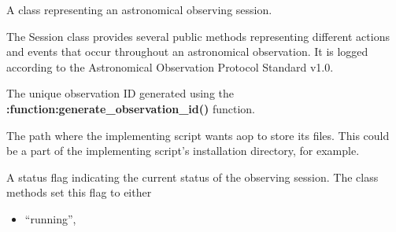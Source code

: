 \documentclass[letterpaper,10pt,english]{sphinxmanual}
\begin{document}
\begin{fulllineitems}
\label{\detokenize{autoapi/aop/aop/index:aop.aop.Session}}
\pysigstartsignatures
{}
\pysigstopsignatures
\sphinxAtStartPar
A class representing an astronomical observing session.

\sphinxAtStartPar
The Session class provides several public methods representing different
actions and events that occur throughout an astronomical observation.
It is logged according to the Astronomical Observation Protocol Standard v1.0.

\begin{fulllineitems}
\label{\detokenize{autoapi/aop/aop/index:aop.aop.Session.obsID}}
\pysigstartsignatures
{}
\pysigstopsignatures
\sphinxAtStartPar
The unique observation ID generated using the {\color{red}\bfseries{}:function:\textasciigrave{}generate\_observation\_id()\textasciigrave{}}
function.

\end{fulllineitems}


\begin{fulllineitems}
\label{\detokenize{autoapi/aop/aop/index:aop.aop.Session.filepath}}
\pysigstartsignatures
{}
\pysigstopsignatures
\sphinxAtStartPar
The path where the implementing script wants aop to store its files. This could be a part of the implementing
script’s installation directory, for example.

\end{fulllineitems}


\begin{fulllineitems}
\label{\detokenize{autoapi/aop/aop/index:aop.aop.Session.state}}
\pysigstartsignatures
{}
\pysigstopsignatures
\sphinxAtStartPar
A status flag indicating the current status of the observing session.
The class methods set this flag to either
\begin{itemize}
\item {} 
\sphinxAtStartPar
“running”,


\end{itemize}
\end{fulllineitems}
\end{fulllineitems}
\end{document}
